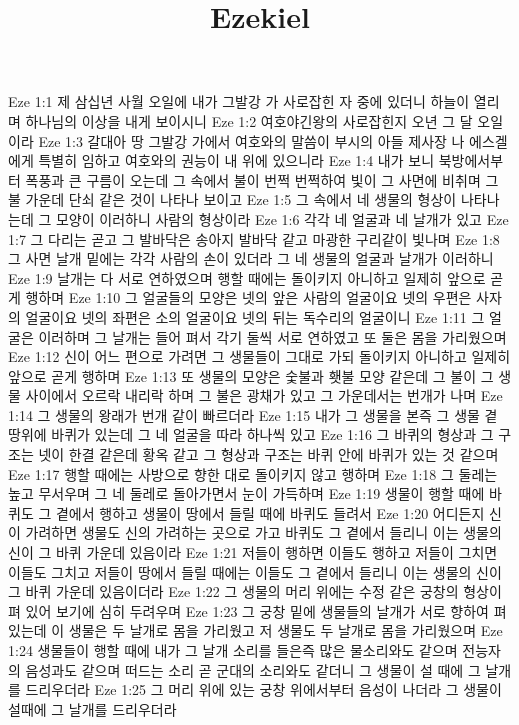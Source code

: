 

\title{Ezekiel}

Eze 1:1  제 삼십년 사월 오일에 내가 그발강 가 사로잡힌 자 중에 있더니 하늘이 열리며 하나님의 이상을 내게 보이시니
Eze 1:2  여호야긴왕의 사로잡힌지 오년 그 달 오일이라
Eze 1:3  갈대아 땅 그발강 가에서 여호와의 말씀이 부시의 아들 제사장 나 에스겔에게 특별히 임하고 여호와의 권능이 내 위에 있으니라
Eze 1:4  내가 보니 북방에서부터 폭풍과 큰 구름이 오는데 그 속에서 불이 번쩍 번쩍하여 빛이 그 사면에 비취며 그 불 가운데 단쇠 같은 것이 나타나 보이고
Eze 1:5  그 속에서 네 생물의 형상이 나타나는데 그 모양이 이러하니 사람의 형상이라
Eze 1:6  각각 네 얼굴과 네 날개가 있고
Eze 1:7  그 다리는 곧고 그 발바닥은 송아지 발바닥 같고 마광한 구리같이 빛나며
Eze 1:8  그 사면 날개 밑에는 각각 사람의 손이 있더라 그 네 생물의 얼굴과 날개가 이러하니
Eze 1:9  날개는 다 서로 연하였으며 행할 때에는 돌이키지 아니하고 일제히 앞으로 곧게 행하며
Eze 1:10  그 얼굴들의 모양은 넷의 앞은 사람의 얼굴이요 넷의 우편은 사자의 얼굴이요 넷의 좌편은 소의 얼굴이요 넷의 뒤는 독수리의 얼굴이니
Eze 1:11  그 얼굴은 이러하며 그 날개는 들어 펴서 각기 둘씩 서로 연하였고 또 둘은 몸을 가리웠으며
Eze 1:12  신이 어느 편으로 가려면 그 생물들이 그대로 가되 돌이키지 아니하고 일제히 앞으로 곧게 행하며
Eze 1:13  또 생물의 모양은 숯불과 횃불 모양 같은데 그 불이 그 생물 사이에서 오르락 내리락 하며 그 불은 광채가 있고 그 가운데서는 번개가 나며
Eze 1:14  그 생물의 왕래가 번개 같이 빠르더라
Eze 1:15  내가 그 생물을 본즉 그 생물 곁 땅위에 바퀴가 있는데 그 네 얼굴을 따라 하나씩 있고
Eze 1:16  그 바퀴의 형상과 그 구조는 넷이 한결 같은데 황옥 같고 그 형상과 구조는 바퀴 안에 바퀴가 있는 것 같으며
Eze 1:17  행할 때에는 사방으로 향한 대로 돌이키지 않고 행하며
Eze 1:18  그 둘레는 높고 무서우며 그 네 둘레로 돌아가면서 눈이 가득하며
Eze 1:19  생물이 행할 때에 바퀴도 그 곁에서 행하고 생물이 땅에서 들릴 때에 바퀴도 들려서
Eze 1:20  어디든지 신이 가려하면 생물도 신의 가려하는 곳으로 가고 바퀴도 그 곁에서 들리니 이는 생물의 신이 그 바퀴 가운데 있음이라
Eze 1:21  저들이 행하면 이들도 행하고 저들이 그치면 이들도 그치고 저들이 땅에서 들릴 때에는 이들도 그 곁에서 들리니 이는 생물의 신이 그 바퀴 가운데 있음이더라
Eze 1:22  그 생물의 머리 위에는 수정 같은 궁창의 형상이 펴 있어 보기에 심히 두려우며
Eze 1:23  그 궁창 밑에 생물들의 날개가 서로 향하여 펴 있는데 이 생물은 두 날개로 몸을 가리웠고 저 생물도 두 날개로 몸을 가리웠으며
Eze 1:24  생물들이 행할 때에 내가 그 날개 소리를 들은즉 많은 물소리와도 같으며 전능자의 음성과도 같으며 떠드는 소리 곧 군대의 소리와도 같더니 그 생물이 설 때에 그 날개를 드리우더라
Eze 1:25  그 머리 위에 있는 궁창 위에서부터 음성이 나더라 그 생물이 설때에 그 날개를 드리우더라

